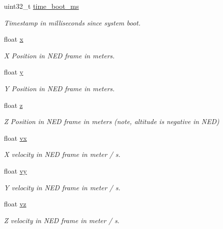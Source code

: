\begin{DoxyCompactItemize}
\item 
uint32\+\_\+t \hyperlink{struct____mavlink__position__target__local__ned__t_af7e31d253c6e972d1e712196e40310af}{time\+\_\+boot\+\_\+ms}
\begin{DoxyCompactList}\small\item\em Timestamp in milliseconds since system boot. \end{DoxyCompactList}\item 
float \hyperlink{struct____mavlink__position__target__local__ned__t_acd9e375486fbe3886526fa88fcb47c7c}{x}
\begin{DoxyCompactList}\small\item\em X Position in N\+E\+D frame in meters. \end{DoxyCompactList}\item 
float \hyperlink{struct____mavlink__position__target__local__ned__t_a9e1cb7c9701232b58700d2548f03a64b}{y}
\begin{DoxyCompactList}\small\item\em Y Position in N\+E\+D frame in meters. \end{DoxyCompactList}\item 
float \hyperlink{struct____mavlink__position__target__local__ned__t_a367fead644dcd0cb7f6147ce129115ce}{z}
\begin{DoxyCompactList}\small\item\em Z Position in N\+E\+D frame in meters (note, altitude is negative in N\+E\+D) \end{DoxyCompactList}\item 
float \hyperlink{struct____mavlink__position__target__local__ned__t_a26145106b47e3693cc9a96d266e503ca}{vx}
\begin{DoxyCompactList}\small\item\em X velocity in N\+E\+D frame in meter / s. \end{DoxyCompactList}\item 
float \hyperlink{struct____mavlink__position__target__local__ned__t_aa991647e3de82e59d644eb693a096213}{vy}
\begin{DoxyCompactList}\small\item\em Y velocity in N\+E\+D frame in meter / s. \end{DoxyCompactList}\item 
float \hyperlink{struct____mavlink__position__target__local__ned__t_abc1c6569159349869a15d572ad5e6d70}{vz}
\begin{DoxyCompactList}\small\item\em Z velocity in N\+E\+D frame in meter / s. \end{DoxyCompactList}\item 

\end{DoxyCompactItemize}
